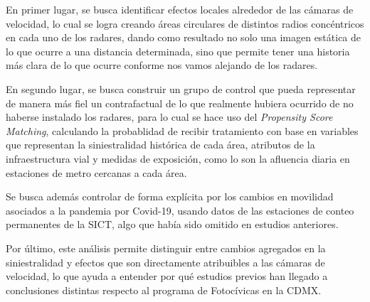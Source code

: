 En primer lugar, se busca identificar efectos locales alrededor de las cámaras de velocidad, lo cual se logra creando áreas circulares de distintos radios concéntricos en cada uno de los radares, dando como resultado no solo una imagen estática de lo que ocurre a una distancia determinada, sino que permite tener una historia más clara de lo que ocurre conforme nos vamos alejando de los radares. 

En segundo lugar, se busca construir un grupo de control que pueda representar de manera más fiel un contrafactual de lo que realmente hubiera ocurrido de no haberse instalado los radares, para lo cual se hace uso del \textit{Propensity Score Matching}, calculando la probablidad de recibir tratamiento con base en variables que representan la siniestralidad histórica de cada área, atributos de la infraestructura vial y medidas de exposición, como lo son la afluencia diaria en estaciones de metro cercanas a cada área. 

Se busca además controlar de forma explícita por los cambios en movilidad asociados a la pandemia por Covid-19, usando datos de las estaciones de conteo permanentes de la SICT, algo que había sido omitido en estudios anteriores. 

Por último, este análisis permite distinguir entre cambios agregados en la siniestralidad y efectos que son directamente atribuibles a las cámaras de velocidad, lo que ayuda a entender por qué estudios previos han llegado a conclusiones distintas respecto al programa de Fotocívicas en la CDMX.